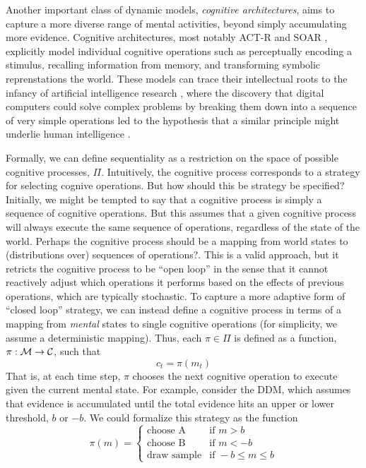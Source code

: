Another important class of dynamic models, \emph{cognitive architectures}, aims to capture a more diverse range of mental activities, beyond simply accumulating more evidence. Cognitive architectures, most notably ACT-R \citep{anderson1996act} and SOAR \citep{laird1987soar}, explicitly model individual cognitive operations such as perceptually encoding a stimulus, recalling information from memory, and transforming symbolic reprenstations the world. These models can trace their intellectual roots to the infancy of artificial intelligence research \citep{newell1956logic}, where the discovery that digital computers could solve complex problems by breaking them down into a sequence of very simple operations led to the hypothesis that a similar principle might underlie human intelligence \citep{newell1958elements,newell1972human}. 

Formally, we can define sequentiality as a restriction on the space of possible cognitive processes, $\Pi$. Intuitively, the cognitive process corresponds to a strategy for selecting cognive operations. But how should this be strategy be specified? Initially, we might be tempted to say that a cognitive process is simply a sequence of cognitive operations. But this assumes that a given cognitive process will always execute the same sequence of operations, regardless of the state of the world. Perhaps the cognitive process should be a mapping from world states to (distributions over) sequences of operations?. This is a valid approach, but it retricts the cognitive process to be ``open loop'' in the sense that it cannot reactively adjust which operations it performs based on the effects of previous operations, which are typically stochastic. To capture a more adaptive form of ``closed loop'' strategy, we can instead define a cognitive process in terms of a mapping from \emph{mental} states to single cognitive operations (for simplicity, we assume a deterministic mapping). Thus, each $π \in \Pi$ is defined as a function, $\pi: \mathcal{M} \rightarrow \mathcal{C}$, such that
\begin{equation}\label{eq:intro-sequential}
   c_t = \pi(m_t)
\end{equation}
That is, at each time step, $\pi$ chooses the next cognitive operation to execute given the current mental state. For example, consider the DDM, which assumes that evidence is accumulated until the total evidence hits an upper or lower threshold, $b$ or $-b$. We could formalize this strategy as the function
\begin{equation}
  \pi(m) = \begin{cases}
    \text{choose A} &\text{if } m > b  \\
    \text{choose B} &\text{if } m < -b  \\
    \text{draw sample} &\text{if } -b ≤ m ≤ b
  \end{cases}
\end{equation}

